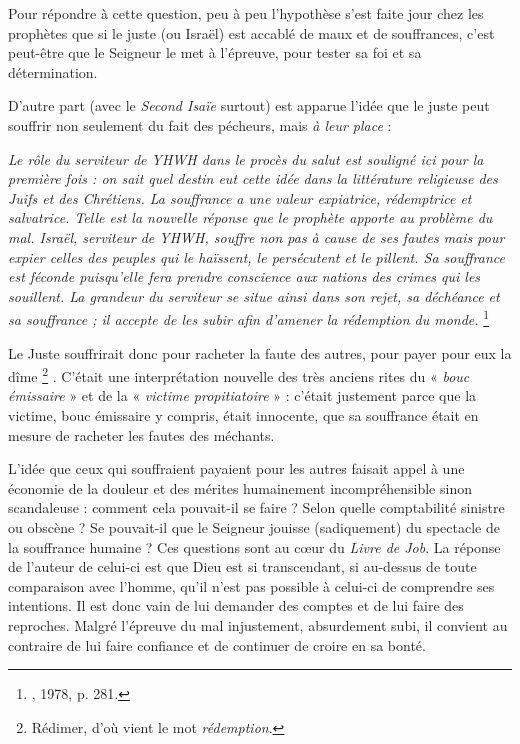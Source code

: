  Pour répondre à cette question, peu à peu l'hypothèse s'est faite jour chez les prophètes que si le juste (ou Israël) est accablé de maux et de souffrances, c'est peut-être que le Seigneur le met à l'épreuve, pour tester sa foi et sa détermination. 

 D'autre part (avec le \emph{Second Isaïe} surtout) est apparue l'idée que le juste peut souffrir non seulement du fait des pécheurs, mais \emph{à leur place} :

\begin{displayquote}
{\emph{Le rôle du serviteur de YHWH dans le procès du salut est souligné ici pour la première fois : on sait quel destin eut cette idée dans la littérature religieuse des Juifs et des Chrétiens. La souffrance a une valeur expiatrice, rédemptrice et salvatrice. Telle est la nouvelle réponse que le prophète apporte au problème du mal. Israël, serviteur de YHWH, souffre non pas à cause de ses fautes mais pour expier celles des peuples qui le haïssent, le persécutent et le pillent. Sa souffrance est féconde puisqu'elle fera prendre conscience aux nations des crimes qui les souillent. La grandeur du serviteur se situe ainsi dans son rejet, sa déchéance et sa souffrance ; il accepte de les subir afin d'amener la rédemption du monde.}%
\footnote{, 1978, p. 281.}%
}
\end{displayquote}

Le Juste souffrirait donc pour racheter la faute des autres, pour payer pour eux la dîme%
\footnote{Rédimer, d'où vient le mot \emph{rédemption}.}%
. C'était une interprétation nouvelle des très anciens rites du « \emph{bouc émissaire} » et de la « \emph{victime propitiatoire} » : c'était justement parce que la victime, bouc émissaire y compris, était innocente, que sa souffrance était en mesure de racheter les fautes des méchants. 

 L'idée que ceux qui souffraient payaient pour les autres faisait appel à une économie de la douleur et des mérites humainement incompréhensible sinon scandaleuse : comment cela pouvait-il se faire ? Selon quelle comptabilité sinistre ou obscène ? Se pouvait-il que le Seigneur jouisse (sadiquement) du spectacle de la souffrance humaine ? Ces questions sont au cœur du \emph{Livre de Job}. La réponse de l'auteur de celui-ci est que Dieu est si transcendant, si au-dessus de toute comparaison avec l'homme, qu'il n'est pas possible à celui-ci de comprendre ses intentions. Il est donc vain de lui demander des comptes et de lui faire des reproches. Malgré l'épreuve du mal injustement, absurdement subi, il convient au contraire de lui faire confiance et de continuer de croire en sa bonté. 

